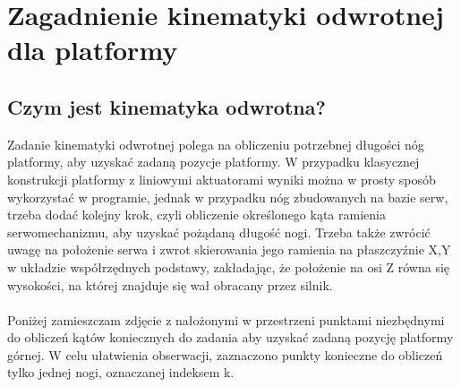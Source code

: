 \newpage %
\section{Zagadnienie kinematyki odwrotnej dla platformy}



\subsection{Czym jest kinematyka odwrotna?}
Zadanie kinematyki odwrotnej polega na obliczeniu potrzebnej długości nóg platformy, aby uzyskać zadaną pozycje platformy. 
W przypadku klasycznej konstrukcji platformy z liniowymi aktuatorami wyniki można w prosty sposób wykorzystać w programie, jednak w przypadku nóg zbudowanych na bazie serw, trzeba dodać kolejny krok, czyli obliczenie określonego kąta ramienia serwomechanizmu, aby uzyskać pożądaną długość nogi. 
Trzeba także zwrócić uwagę na położenie serwa i zwrot skierowania jego ramienia na płaszczyźnie X,Y w układzie współrzędnych podstawy, zakładając, że położenie na osi Z równa się wysokości, na której znajduje się wał obracany przez silnik.
\\\\
Poniżej zamieszczam zdjęcie z nałożonymi w przestrzeni punktami niezbędnymi do obliczeń kątów koniecznych do zadania aby uzyskać zadaną pozycję platformy górnej.
W celu ułatwienia obserwacji, zaznaczono punkty konieczne do obliczeń tylko jednej nogi, oznaczanej indeksem k.

